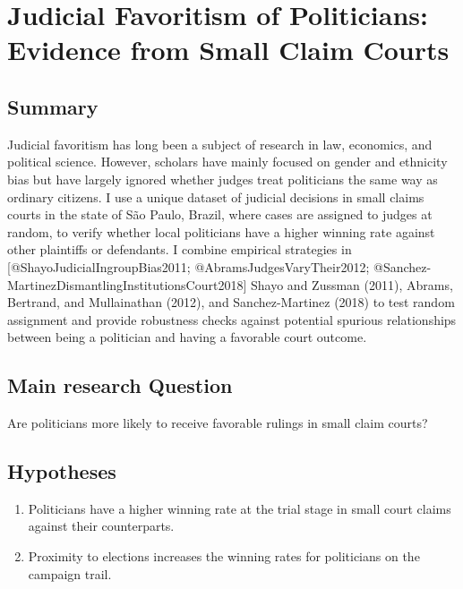 \documentclass[]{article}
\title{}
\author{}
\date{}
\begin{document}
\hypertarget{title2}{%
\section{Judicial Favoritism of Politicians: Evidence from Small Claim
Courts}\label{title2}}

\hypertarget{summary}{%
\subsection{Summary}\label{summary}}

Judicial favoritism has long been a subject of research in law,
economics, and political science. However, scholars have mainly focused
on gender and ethnicity bias but have largely ignored whether judges
treat politicians the same way as ordinary citizens. I use a unique
dataset of judicial decisions in small claims courts in the state of São
Paulo, Brazil, where cases are assigned to judges at random, to verify
whether local politicians have a higher winning rate against other
plaintiffs or defendants. I combine empirical strategies in
{[}@ShayoJudicialIngroupBias2011; @AbramsJudgesVaryTheir2012;
@Sanchez-MartinezDismantlingInstitutionsCourt2018{]} Shayo and Zussman
(2011), Abrams, Bertrand, and Mullainathan (2012), and Sanchez-Martinez
(2018) to test random assignment and provide robustness checks against
potential spurious relationships between being a politician and having a
favorable court outcome.

\hypertarget{main-research-question}{%
\subsection{Main research Question}\label{main-research-question}}

Are politicians more likely to receive favorable rulings in small claim
courts?

\hypertarget{hypotheses}{%
\subsection{Hypotheses}\label{hypotheses}}

\begin{enumerate}
\item
  Politicians have a higher winning rate at the trial stage in small
  court claims against their counterparts.
\item
  Proximity to elections increases the winning rates for politicians on
  the campaign trail.
\end{enumerate}
\end{document}
